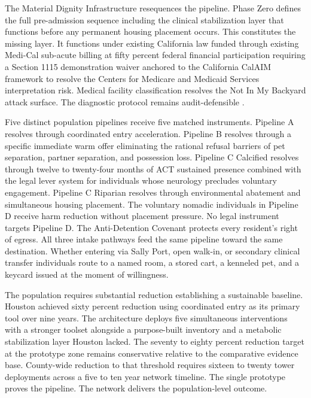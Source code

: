 \documentclass[12pt, letterpaper]{article}
\begin{document}
The Material Dignity Infrastructure resequences the pipeline. Phase Zero defines the full pre-admission sequence including the clinical stabilization layer that functions before any permanent housing placement occurs. This constitutes the missing layer. It functions under existing California law funded through existing Medi-Cal sub-acute billing at fifty percent federal financial participation requiring a Section 1115 demonstration waiver anchored to the California CalAIM framework \citep{calaim_1115_waiver_2023} to resolve the Centers for Medicare and Medicaid Services interpretation risk. Medical facility classification resolves the Not In My Backyard attack surface. The diagnostic protocol remains audit-defensible \citep{dhcs_mhrc_2024}.

Five distinct population pipelines receive five matched instruments. Pipeline A resolves through coordinated entry acceleration. Pipeline B resolves through a specific immediate warm offer eliminating the rational refusal barriers of pet separation, partner separation, and possession loss. Pipeline C Calcified resolves through twelve to twenty-four months of ACT sustained presence combined with the legal lever system for individuals whose neurology precludes voluntary engagement. Pipeline C Riparian resolves through environmental abatement and simultaneous housing placement. The voluntary nomadic individuals in Pipeline D receive harm reduction without placement pressure. No legal instrument targets Pipeline D. The Anti-Detention Covenant protects every resident's right of egress. All three intake pathways feed the same pipeline toward the same destination. Whether entering via Sally Port, open walk-in, or secondary clinical transfer individuals route to a named room, a stored cart, a kenneled pet, and a keycard issued at the moment of willingness.

The population requires substantial reduction establishing a sustainable baseline. Houston achieved sixty percent reduction using coordinated entry as its primary tool over nine years. The architecture deploys five simultaneous interventions with a stronger toolset alongside a purpose-built inventory and a metabolic stabilization layer Houston lacked. The seventy to eighty percent reduction target at the prototype zone remains conservative relative to the comparative evidence base. County-wide reduction to that threshold requires sixteen to twenty tower deployments across a five to ten year network timeline. The single prototype proves the pipeline. The network delivers the population-level outcome.
\end{document}
